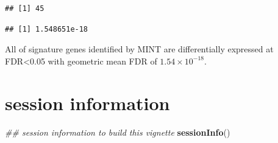 \documentclass[]{book}
\newenvironment{Shaded}{\begin{snugshade}}{\end{snugshade}}
\newcommand{\CommentTok}[1]{\textcolor[rgb]{0.56,0.35,0.01}{\textit{#1}}}
\newcommand{\KeywordTok}[1]{\textcolor[rgb]{0.13,0.29,0.53}{\textbf{#1}}}
\newcommand{\NormalTok}[1]{#1}
\newcommand{\OperatorTok}[1]{\textcolor[rgb]{0.81,0.36,0.00}{\textbf{#1}}}
\theoremstyle{definition}
\theoremstyle{definition}
\theoremstyle{definition}
\theoremstyle{remark}
\begin{document}
\begin{verbatim}
## [1] 45
\end{verbatim}

\begin{Shaded}
\end{Shaded}

\begin{verbatim}
## [1] 1.548651e-18
\end{verbatim}

All of signature genes identified by MINT are differentially expressed
at FDR\textless{}0.05 with geometric mean FDR of \(1.54\times10^{-18}\).

\hypertarget{session-information-1}{%
\section{session information}\label{session-information-1}}

\begin{Shaded}
\begin{Highlighting}[]
\CommentTok{## session information to build this vignette}
\KeywordTok{sessionInfo}\NormalTok{()}
\end{Highlighting}
\end{Shaded}
\end{document}
